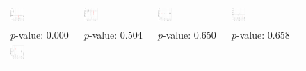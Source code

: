 \documentclass[12pt]{article}
\begin{document}
\begin{figure}[!ht]
\begin{minipage}{1\linewidth}
{\begin{tabular}{C{3.7cm}C{3.7cm}C{3.7cm}C{3.7cm}}
\hspace{-2em}  \includegraphics[width = 0.22\textwidth]{figure/carryover/FouirnaiesHall_carryover.png} &
\hspace{-2em}  \includegraphics[width = 0.22\textwidth]{figure/carryover/Fouirnaies2022_carryover.png} &
\hspace{-2em}  \includegraphics[width = 0.22\textwidth]{figure/carryover/Grumbach_carryover.png} &
  \hspace{-2em}  \includegraphics[width = 0.22\textwidth]{figure/carryover/GH_carryover.png} \\
  \citet{Hall2022}\newline $p$-value: 0.000 &   
  \citet{Jiang2018} \newline $p$-value: 0.504 &
  \citet{kilborn2022public}\newline $p$-value: 0.650 &
      \citet{Payson2020jop}\newline $p$-value: 0.658\\
  \hspace{-2em} \includegraphics[width = 0.22\textwidth]{figure/carryover/hallyoder_carryover.png} &

\end{tabular}}
\end{minipage}
\end{figure}
\end{document}
